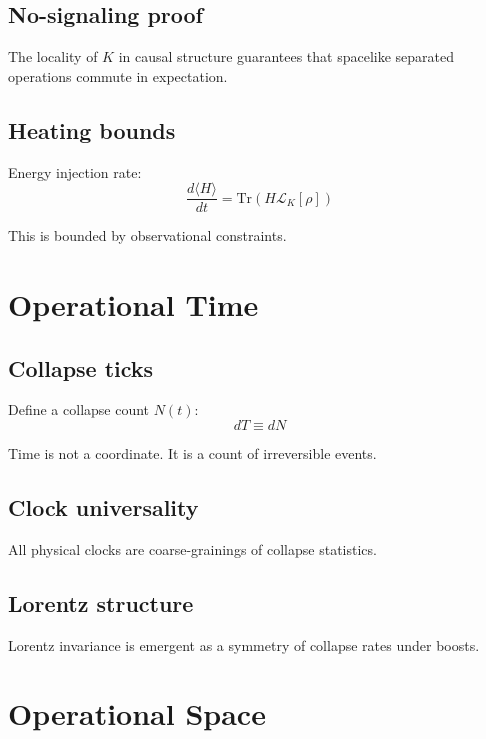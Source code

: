 \documentclass[11pt]{book}
\newcommand{\Tr}{\mathrm{Tr}}
\begin{document}
\section{No-signaling proof}

The locality of $K$ in causal structure guarantees that spacelike separated
operations commute in expectation.

\section{Heating bounds}

Energy injection rate:
\begin{equation}
\frac{d\langle H\rangle}{dt}
= \Tr(H\mathcal{L}_K[\rho])
\end{equation}

This is bounded by observational constraints.

\chapter{Operational Time}

\section{Collapse ticks}

Define a collapse count $N(t)$:
\begin{equation}
dT \equiv dN
\end{equation}

Time is not a coordinate. It is a count of irreversible events.

\section{Clock universality}

All physical clocks are coarse-grainings of collapse statistics.

\section{Lorentz structure}

Lorentz invariance is emergent as a symmetry of collapse rates under boosts.

\chapter{Operational Space}
\end{document}
